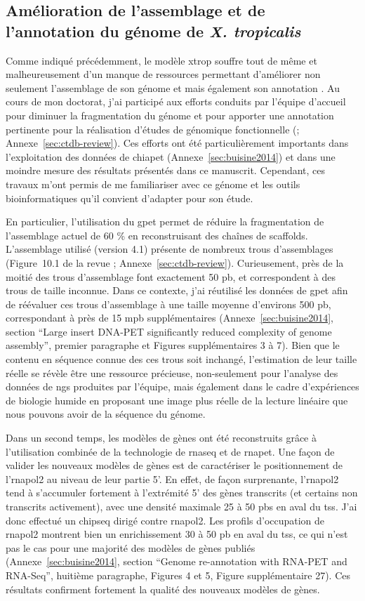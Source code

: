 \documentclass[../main.tex]{subfiles}
\begin{document}
\subsection{Amélioration de l'assemblage et de l'annotation du génome de \textit{X. tropicalis}}
Comme indiqué précédemment, le modèle \gls{xtrop} souffre tout de même et malheureusement d'un manque de ressources permettant d'améliorer non seulement l'assemblage de son génome et mais également son annotation \citep{Gilchrist2012}.
Au cours de mon doctorat, j'ai participé aux efforts conduits par l'équipe d'accueil pour diminuer la fragmentation du génome et pour apporter une annotation pertinente pour la réalisation d'études de génomique fonctionnelle (\citealp{Grimaldi2013}; Annexe~\ref{sec:ctdb-review}).
Ces efforts ont été particulièrement importants dans l'exploitation des données de \gls{chiapet} (Annexe~\ref{sec:buisine2014}) et dans une moindre mesure des résultats présentés dans ce manuscrit.
Cependant, ces travaux m'ont permis de me familiariser avec ce génome et les outils bioinformatiques qu'il convient d'adapter pour son étude.
\par
En particulier, l'utilisation du \gls{gpet} permet de réduire la fragmentation de l'assemblage actuel de 60 \% en reconstruisant des chaînes de scaffolds.
L'assemblage utilisé (version 4.1) présente de nombreux trous d'assemblages (Figure~10.1 de la revue \citealp{Grimaldi2013}; Annexe~\ref{sec:ctdb-review}).
Curieusement, près de la moitié des trous d'assemblage font exactement 50 \gls{pb}, et correspondent à des trous de taille inconnue.
Dans ce contexte, j'ai réutilisé les données de \gls{gpet} afin de réévaluer ces trous d'assemblage à une taille moyenne d'environs 500 \gls{pb}, correspondant à près de 15 \gls{mpb} supplémentaires (Annexe~\ref{sec:buisine2014}, section ``Large insert DNA-PET significantly reduced complexity of genome assembly'', premier paragraphe et Figures supplémentaires 3 à 7).
Bien que le contenu en séquence connue des ces trous soit inchangé, l'estimation de leur taille réelle se révèle être une ressource précieuse, non-seulement pour l'analyse des données de \gls{ngs} produites par l'équipe, mais également dans le cadre d'expériences de biologie humide en proposant une image plus réelle de la lecture linéaire que nous pouvons avoir de la séquence du génome.
\par
Dans un second temps, les modèles de gènes ont été reconstruits grâce à l'utilisation combinée de la technologie de \gls{rnaseq} et de \gls{rnapet}.
Une façon de valider les nouveaux modèles de gènes est de caractériser le positionnement de l'\gls{rnapol2} au niveau de leur partie 5'.
En effet, de façon surprenante, l'\gls{rnapol2} tend à s'accumuler fortement à l'extrémité 5' des gènes transcrits (et certains non transcrits activement), avec une densité maximale 25 à 50 \glspl{pb} en aval du \gls{tss}.
J'ai donc effectué un \gls{chipseq} dirigé contre \gls{rnapol2}.
Les profils d'occupation de \gls{rnapol2} montrent bien un enrichissement 30 à 50 \gls{pb} en aval du \gls{tss}, ce qui n'est pas le cas pour une majorité des modèles de gènes publiés (Annexe~\ref{sec:buisine2014}, section ``Genome re-annotation with RNA-PET and RNA-Seq'', huitième paragraphe, Figures 4 et 5, Figure supplémentaire 27).
Ces résultats confirment fortement la qualité des nouveaux modèles de gènes.
\end{document}

